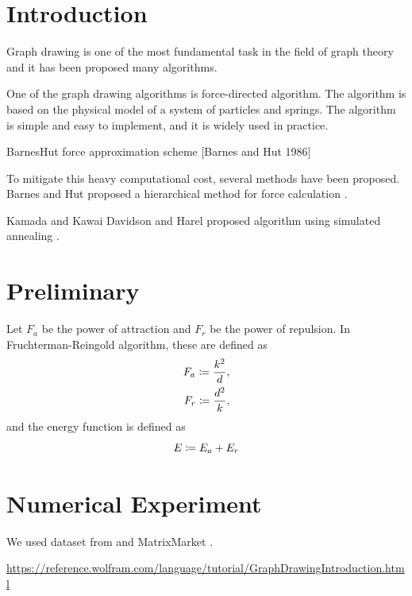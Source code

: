 \documentclass[\main/include]{subfiles}
\begin{document}
\section{Introduction}

Graph drawing is one of the most fundamental task in the field of graph theory and it has been proposed many algorithms.

One of the graph drawing algorithms is force-directed algorithm. The algorithm is based on the physical model of a system of particles and springs. The algorithm is simple and easy to implement, and it is widely used in practice.

BarnesHut force approximation scheme [Barnes and Hut 1986]


To mitigate this heavy computational cost, several methods have been proposed.
Barnes and Hut proposed a hierarchical method for force calculation
\cite{barnesHierarchicalLogForcecalculation1986}.

Kamada and Kawai
Davidson and Harel proposed algorithm using simulated annealing \cite{davidson1996drawing}.

\section{Preliminary}

Let $F_a$ be the power of attraction and $F_r$ be the power of repulsion. In Fruchterman-Reingold algorithm, these are defined as
\begin{align*}
  F_a \defeq \frac{k^2}{d}, \\
  F_r \defeq \frac{d^2}{k},
\end{align*}
and the energy function is defined as
\begin{equation*}
  E \defeq E_a + E_r
\end{equation*}

\section{Numerical Experiment}

We used dataset from \cite{davis2011university} and MatrixMarket \cite{boisvertMatrixMarketWeb1997}.

\url{https://reference.wolfram.com/language/tutorial/GraphDrawingIntroduction.html}

\begin{tikzpicture}
\end{tikzpicture}
\end{document}
